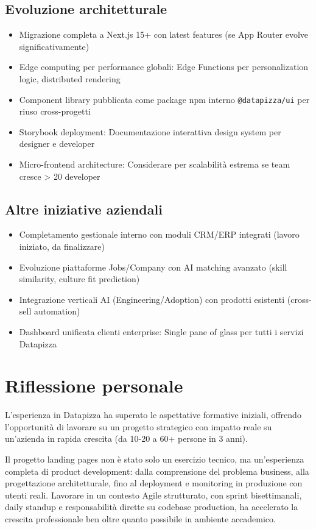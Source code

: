 \subsection{Evoluzione architetturale}
\begin{itemize}
  \item Migrazione completa a Next.js 15+ con latest features (se App 
        Router evolve significativamente)
  \item Edge computing per performance globali: Edge Functions per 
        personalization logic, distributed rendering
  \item Component library pubblicata come package npm interno 
        \texttt{@datapizza/ui} per riuso cross-progetti
  \item Storybook deployment: Documentazione interattiva design system 
        per designer e developer
  \item Micro-frontend architecture: Considerare per scalabilità 
        estrema se team cresce > 20 developer
\end{itemize}

\subsection{Altre iniziative aziendali}
\begin{itemize}
  \item Completamento gestionale interno con moduli CRM/ERP integrati 
        (lavoro iniziato, da finalizzare)
  \item Evoluzione piattaforme Jobs/Company con AI matching avanzato 
        (skill similarity, culture fit prediction)
  \item Integrazione verticali AI (Engineering/Adoption) con prodotti 
        esistenti (cross-sell automation)
  \item Dashboard unificata clienti enterprise: Single pane of glass 
        per tutti i servizi Datapizza
\end{itemize}

\section{Riflessione personale}
L'esperienza in Datapizza ha superato le aspettative formative iniziali, 
offrendo l'opportunità di lavorare su un progetto strategico con impatto 
reale su un'azienda in rapida crescita (da 10-20 a 60+ persone in 3 anni).

Il progetto landing pages non è stato solo un esercizio tecnico, ma 
un'esperienza completa di product development: dalla comprensione del 
problema business, alla progettazione architetturale, fino al deployment 
e monitoring in produzione con utenti reali. Lavorare in un contesto 
Agile strutturato, con sprint bisettimanali, daily standup e 
responsabilità dirette su codebase production, ha accelerato la crescita 
professionale ben oltre quanto possibile in ambiente accademico.

